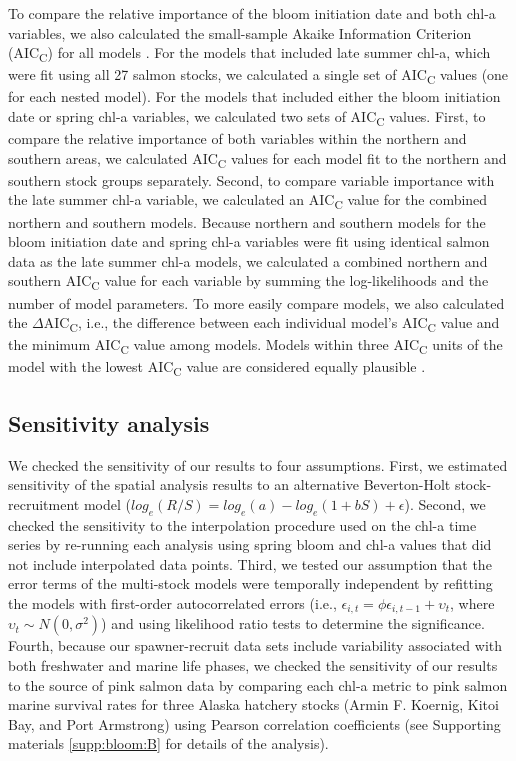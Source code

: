 To compare the relative importance of the bloom initiation date and both chl-a
variables, we also calculated the small-sample Akaike Information Criterion
(AIC\textsubscript{C}) for all models \citep{Hurvich1989a, Burnham2002a}. For
the models that included late summer chl-a, which were fit using all 27 salmon
stocks, we calculated a single set of AIC\textsubscript{C} values (one for each
nested model).  For the models that included either the bloom initiation date or
spring chl-a variables, we calculated two sets of AIC\textsubscript{C} values.
First, to compare the relative importance of both variables within the northern
and southern areas, we calculated AIC\textsubscript{C} values for each model fit
to the northern and southern stock groups separately.  Second, to compare
variable importance with the late summer chl-a variable, we calculated an
AIC\textsubscript{C} value for the combined northern and southern models.
Because northern and southern models for the bloom initiation date and spring
chl-a variables were fit using identical salmon data as the late summer chl-a
models, we calculated a combined northern and southern AIC\textsubscript{C}
value for each variable by summing the log-likelihoods and the number of model
parameters. To more easily compare models, we also calculated the
\(\Delta\)AIC\textsubscript{C}, i.e., the difference between each individual
model's AIC\textsubscript{C} value and the minimum AIC\textsubscript{C} value
among models. Models within three AIC\textsubscript{C} units of the model with
the lowest AIC\textsubscript{C} value are considered equally plausible
\citep{Burnham2002a}.


\subsection{Sensitivity analysis}

We checked the sensitivity of our results to four assumptions. First, we
estimated sensitivity of the spatial analysis results to an alternative
Beverton-Holt stock-recruitment model \citep{Beverton1957a} ($log_{e}(R/S) =
log_{e}(a) - log_{e}(1 + bS) + \epsilon$).  Second, we checked the sensitivity
to the interpolation procedure used on the chl-a time series by re-running each
analysis using spring bloom and chl-a values that did not include interpolated
data points. Third, we tested our assumption that the error terms of the
multi-stock models were temporally independent by refitting the models with
first-order autocorrelated errors (i.e., \(\epsilon_{i,t} = \phi\epsilon_{i,t-1}
+ \upsilon_t\), where \(\upsilon_t \sim N(0, \sigma^2)\)) and using likelihood
ratio tests to determine the significance. Fourth, because our spawner-recruit
data sets include variability associated with both freshwater and marine life
phases, we checked the sensitivity of our results to the source of pink salmon
data by comparing each chl-a metric to pink salmon marine survival rates for
three Alaska hatchery stocks (Armin F. Koernig, Kitoi Bay, and Port Armstrong)
using Pearson correlation coefficients (see Supporting materials
\ref{supp:bloom:B} for details of the analysis).



